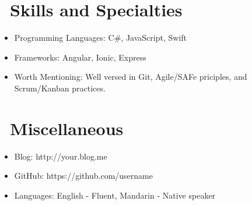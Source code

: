 \documentclass{resume}
\begin{document}

\section{\faCogs\ Skills and Specialties}
\begin{itemize}[parsep=0.5ex]
  \item Programming Languages: C#, JavaScript, Swift
  \item Frameworks: Angular, Ionic, Express
  \item Worth Mentioning: Well versed in Git, Agile/SAFe priciples, and Scrum/Kanban practices.
\end{itemize}

\section{\faInfo\ Miscellaneous}
\begin{itemize}[parsep=0.5ex]
  \item Blog: http://your.blog.me
  \item GitHub: https://github.com/username
  \item Languages: English - Fluent, Mandarin - Native speaker
\end{itemize}

%
%
\end{document}
